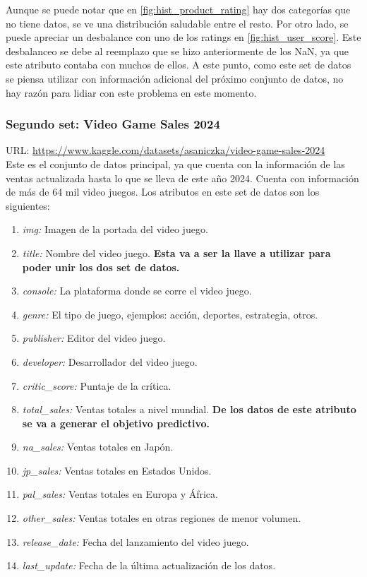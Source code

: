 \documentclass[a4paper]{article}
\begin{document}
    Aunque se puede notar que en \ref{fig:hist_product_rating} hay dos categorías que no tiene datos, se ve una distribución saludable entre el resto. Por otro lado, se puede apreciar un desbalance con uno de los ratings en \ref{fig:hist_user_score}. Este desbalanceo se debe al reemplazo que se hizo anteriormente de los NaN, ya que este atributo contaba con muchos de ellos. A este punto, como este set de datos se piensa utilizar con información adicional del próximo conjunto de datos, no hay razón para lidiar con este problema en este momento.


\subsubsection{Segundo set: Video Game Sales 2024}
URL: \url{https://www.kaggle.com/datasets/asaniczka/video-game-sales-2024}\\
Este es el conjunto de datos principal, ya que cuenta con la información de las ventas actualizada hasta lo que se lleva de este año 2024. Cuenta con información de más de 64 mil video juegos. Los atributos en este set de datos son los siguientes:
    \begin{enumerate}
        \item \textit{img:} Imagen de la portada del video juego.
        \item \textit{title:} Nombre del video juego. \textbf{Esta va a ser la llave a utilizar para poder unir los dos set de datos.}
        \item \textit{console:} La plataforma donde se corre el video juego.
        \item \textit{genre:} El tipo de juego, ejemplos: acción, deportes, estrategia, otros.
        \item \textit{publisher:} Editor del video juego.
        \item \textit{developer:} Desarrollador del video juego.
        \item \textit{critic\_score:} Puntaje de la crítica.
        \item \textit{total\_sales:} Ventas totales a nivel mundial. \textbf{De los datos de este atributo se va a generar el objetivo predictivo.}
        \item \textit{na\_sales:} Ventas totales en Japón.
        \item \textit{jp\_sales:} Ventas totales en Estados Unidos.
        \item \textit{pal\_sales:} Ventas totales en Europa y África.
        \item \textit{other\_sales:} Ventas totales en otras regiones de menor volumen.
        \item \textit{release\_date:} Fecha del lanzamiento del video juego.
        \item \textit{last\_update:} Fecha de la última actualización de los datos.
    \end{enumerate}
\end{document}
